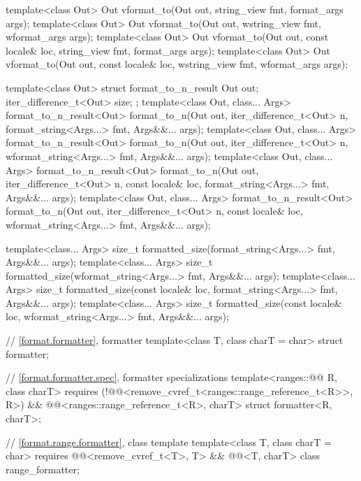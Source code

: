 \begin{codeblock}
{  template<class Out>
    Out vformat_to(Out out, string_view fmt, format_args args);
  template<class Out>
    Out vformat_to(Out out, wstring_view fmt, wformat_args args);
  template<class Out>
    Out vformat_to(Out out, const locale& loc, string_view fmt, format_args args);
  template<class Out>
    Out vformat_to(Out out, const locale& loc, wstring_view fmt, wformat_args args);

  template<class Out> struct format_to_n_result {
    Out out;
    iter_difference_t<Out> size;
  };
  template<class Out, class... Args>
    format_to_n_result<Out> format_to_n(Out out, iter_difference_t<Out> n,
                                        format_string<Args...> fmt, Args&&... args);
  template<class Out, class... Args>
    format_to_n_result<Out> format_to_n(Out out, iter_difference_t<Out> n,
                                        wformat_string<Args...> fmt, Args&&... args);
  template<class Out, class... Args>
    format_to_n_result<Out> format_to_n(Out out, iter_difference_t<Out> n,
                                        const locale& loc, format_string<Args...> fmt,
                                        Args&&... args);
  template<class Out, class... Args>
    format_to_n_result<Out> format_to_n(Out out, iter_difference_t<Out> n,
                                        const locale& loc, wformat_string<Args...> fmt,
                                        Args&&... args);

  template<class... Args>
    size_t formatted_size(format_string<Args...> fmt, Args&&... args);
  template<class... Args>
    size_t formatted_size(wformat_string<Args...> fmt, Args&&... args);
  template<class... Args>
    size_t formatted_size(const locale& loc, format_string<Args...> fmt, Args&&... args);
  template<class... Args>
    size_t formatted_size(const locale& loc, wformat_string<Args...> fmt, Args&&... args);

  // \ref{format.formatter}, formatter
  template<class T, class charT = char> struct formatter;

  // \ref{format.formatter.spec}, formatter specializations
  template<ranges::@@ R, class charT>
    requires (!@@<remove_cvref_t<ranges::range_reference_t<R>>, R>) &&
             @@<ranges::range_reference_t<R>, charT>
  struct formatter<R, charT>;

  // \ref{format.range.formatter}, class template 
  template<class T, class charT = char>
    requires @@<remove_cvref_t<T>, T> && @@<T, charT>
  class range_formatter;

}
\end{codeblock}
